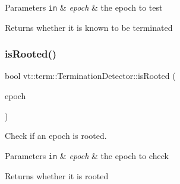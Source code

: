 \begin{DoxyParams}[1]{Parameters}
\mbox{\tt in}  & {\em epoch} & the epoch to test\\
\hline
\end{DoxyParams}
\begin{DoxyReturn}{Returns}
whether it is known to be terminated 
\end{DoxyReturn}
\mbox{\label{structvt_1_1term_1_1_termination_detector_ad95b226357b77e29c415627bbca4e798}} 
\subsubsection{\texorpdfstring{is\+Rooted()}{isRooted()}}
{\footnotesize\ttfamily bool vt\+::term\+::\+Termination\+Detector\+::is\+Rooted (\begin{DoxyParamCaption}\item[{\hyperlink{namespacevt_a985a5adf291c34a3ca263b3378388236}{Epoch\+Type}}]{epoch }\end{DoxyParamCaption})\hspace{0.3cm}{\ttfamily [inline]}}



Check if an epoch is rooted. 


\begin{DoxyParams}[1]{Parameters}
\mbox{\tt in}  & {\em epoch} & the epoch to check\\
\hline
\end{DoxyParams}
\begin{DoxyReturn}{Returns}
whether it is rooted 
\end{DoxyReturn}
\mbox{\label{structvt_1_1term_1_1_termination_detector_a48d9022d6bb4ff56e42ebefebe1a0586}} 

